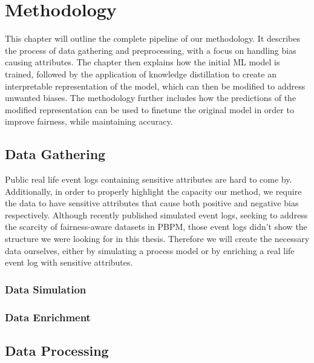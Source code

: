 \chapter{Methodology}
\label{sec: methodology}
This chapter will outline the complete pipeline of our methodology.
It describes the process of data gathering and preprocessing,
with a focus on handling bias
causing attributes.
The chapter then explains how the initial ML model is trained,
followed by the application of knowledge distillation to create an interpretable
representation of the model, which can then be modified to address unwanted biases.
The methodology further includes how the predictions of the modified representation
can be used to finetune the original model in order to improve fairness, while maintaining accuracy.

\section{Data Gathering}
Public real life event logs
containing sensitive attributes are hard to come by.
Additionally, in order to properly highlight the capacity our method,
we require the data to have sensitive attributes
that cause both positive and negative bias respectively.
Although \cite{simulated_logs} recently published simulated event logs,
seeking to address the scarcity of fairness-aware datasets in PBPM,
those event logs didn't show the structure we were looking for in this thesis.
Therefore we will create the necessary data ourselves,
either by simulating a process model or by enriching a real life event log with sensitive attributes.

\subsection{Data Simulation}



\subsection{Data Enrichment}

\section{Data Processing}

